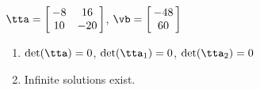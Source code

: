 {$\tta = \left[\hskip -3pt \begin{array}{cc} -8&16\\  10&-20\end {array} \hskip -3pt
 \right]$,
 \quad
$\vb = \left[\hskip -3pt \begin{array}{c} -48\\  60\end {array} \hskip -3pt
 \right]$}
{\begin{enumerate}
\item	$\det(\tta) = 0$, $\det(\tta_1) = 0$, $\det(\tta_2) = 0$
\item Infinite solutions exist.
\end{enumerate}
}
 


